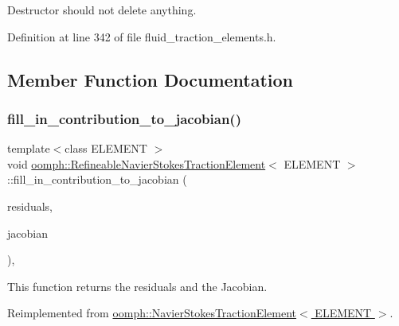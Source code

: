 Destructor should not delete anything. 



Definition at line 342 of file fluid\+\_\+traction\+\_\+elements.\+h.



\subsection{Member Function Documentation}
\mbox{\label{classoomph_1_1RefineableNavierStokesTractionElement_a67eea13f9a419e35576b6183f0438bab}} 
\subsubsection{\texorpdfstring{fill\+\_\+in\+\_\+contribution\+\_\+to\+\_\+jacobian()}{fill\_in\_contribution\_to\_jacobian()}}
{\footnotesize\ttfamily template$<$class E\+L\+E\+M\+E\+NT $>$ \\
void \hyperlink{classoomph_1_1RefineableNavierStokesTractionElement}{oomph\+::\+Refineable\+Navier\+Stokes\+Traction\+Element}$<$ E\+L\+E\+M\+E\+NT $>$\+::fill\+\_\+in\+\_\+contribution\+\_\+to\+\_\+jacobian (\begin{DoxyParamCaption}\item[{\hyperlink{classoomph_1_1Vector}{Vector}$<$ double $>$ \&}]{residuals,  }\item[{\hyperlink{classoomph_1_1DenseMatrix}{Dense\+Matrix}$<$ double $>$ \&}]{jacobian }\end{DoxyParamCaption})\hspace{0.3cm}{\ttfamily [inline]}, {\ttfamily [virtual]}}



This function returns the residuals and the Jacobian. 



Reimplemented from \hyperlink{classoomph_1_1NavierStokesTractionElement_a87adb28c2292e58aab9ff1d1ebbd3fc7}{oomph\+::\+Navier\+Stokes\+Traction\+Element$<$ E\+L\+E\+M\+E\+N\+T $>$}.



